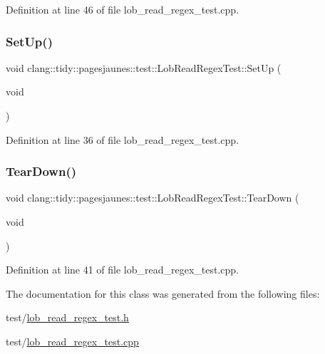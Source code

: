 Definition at line 46 of file lob\+\_\+read\+\_\+regex\+\_\+test.\+cpp.

\mbox{\label{classclang_1_1tidy_1_1pagesjaunes_1_1test_1_1_lob_read_regex_test_ad3e4de27f5261021c082868bb78022d2}} 
\subsubsection{\texorpdfstring{Set\+Up()}{SetUp()}}
{\footnotesize\ttfamily void clang\+::tidy\+::pagesjaunes\+::test\+::\+Lob\+Read\+Regex\+Test\+::\+Set\+Up (\begin{DoxyParamCaption}\item[{void}]{ }\end{DoxyParamCaption})\hspace{0.3cm}{\ttfamily [virtual]}}



Definition at line 36 of file lob\+\_\+read\+\_\+regex\+\_\+test.\+cpp.

\mbox{\label{classclang_1_1tidy_1_1pagesjaunes_1_1test_1_1_lob_read_regex_test_ac3437fe37aa4175e230c621874845eb8}} 
\subsubsection{\texorpdfstring{Tear\+Down()}{TearDown()}}
{\footnotesize\ttfamily void clang\+::tidy\+::pagesjaunes\+::test\+::\+Lob\+Read\+Regex\+Test\+::\+Tear\+Down (\begin{DoxyParamCaption}\item[{void}]{ }\end{DoxyParamCaption})\hspace{0.3cm}{\ttfamily [virtual]}}



Definition at line 41 of file lob\+\_\+read\+\_\+regex\+\_\+test.\+cpp.



The documentation for this class was generated from the following files\+:\begin{DoxyCompactItemize}
\item 
test/\hyperlink{lob__read__regex__test_8h}{lob\+\_\+read\+\_\+regex\+\_\+test.\+h}\item 
test/\hyperlink{lob__read__regex__test_8cpp}{lob\+\_\+read\+\_\+regex\+\_\+test.\+cpp}\end{DoxyCompactItemize}
